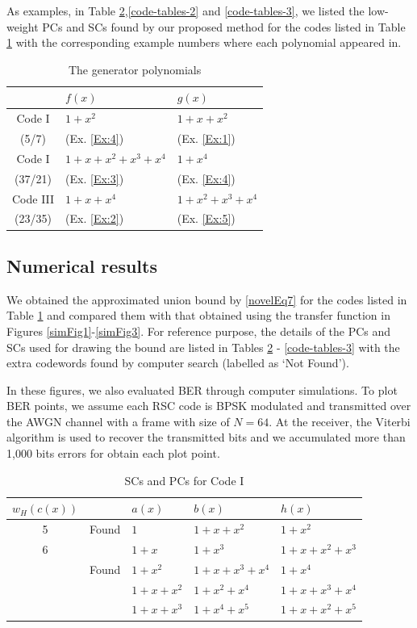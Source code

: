 As examples, in Table \ref{code-tables-1},\ref{code-tables-2} and \ref{code-tables-3}, we listed the low-weight PCs and SCs found by our proposed method for the codes listed in Table \ref{TB:Codes} with the corresponding example numbers where each polynomial appeared in.
\begin{table}[htbp]
	\caption{The generator polynomials}
	\centering
	\begin{tabular}{cll} 
		\toprule
			& $f(x)$ & $g(x)$ \\ %
		\midrule
		Code I & $1+x^2$ & $1+x+x^2$\\
		(5/7) &  (Ex. \ref{Ex:4}) &  (Ex. \ref{Ex:1}) \\\hline
		Code I& $1+x+x^2+x^3+x^4$& $1+x^4$\\
		(37/21) &  (Ex. \ref{Ex:3}) &  (Ex. \ref{Ex:4})\\\hline
		Code III& $1+x+x^4$& $1+x^2+x^3+x^4$\\
		(23/35) &  (Ex. \ref{Ex:2}) &  (Ex. \ref{Ex:5})\\
		\bottomrule
	\end{tabular}
	\label{TB:Codes}
\end{table}

\subsection{Numerical results}
We obtained the approximated union bound by \eqref{novelEq7} for the codes listed in Table \ref{TB:Codes}  and compared them with that obtained using the transfer function in Figures \ref{simFig1}-\ref{simFig3}.
For reference purpose, the details of the PCs and SCs used for drawing the bound are listed in Tables \ref{code-tables-1} - \ref{code-tables-3} with the extra codewords found by computer search (labelled as `Not Found').

In these figures, we also evaluated BER through computer simulations. To plot BER points, we assume each RSC code is BPSK modulated and transmitted over the AWGN channel with a frame with size of $N=64$. At the receiver, the Viterbi algorithm is used to recover the transmitted bits and we accumulated more than 1,000 bits errors for obtain each plot point.

\begin{table}[hbp]
		\caption{SCs and PCs for Code I}
		\centering
		\begin{tabularx}{0.48\textwidth}{|c|c|XXX} 
			\toprule
			$w_H(c(x))$& ~ & $a(x)$ & $b(x)$ & $h(x)$ \\ %
			\midrule
			5&Found&$1$ & $1+x+x^{2}$ & $1+x^2$\\
			\cline{1-5}
			6&~&$1+x$ & $1+x^3$ & $1+x+x^2+x^3$\\
			&Found&$1+x^2$ & $1+x+x^3+x^4$ & $1+x^{4}$\\
			&~&$1+x+x^2$ & $1+x^2+x^4$ & $1+x+x^3+x^4$\\
			&~&$1+x+x^3$ & $1+x^4+x^5$ & $1+x+x^2+x^5$\\
			\bottomrule
		\end{tabularx}		
		\label{code-tables-1}
	\end{table}
	
